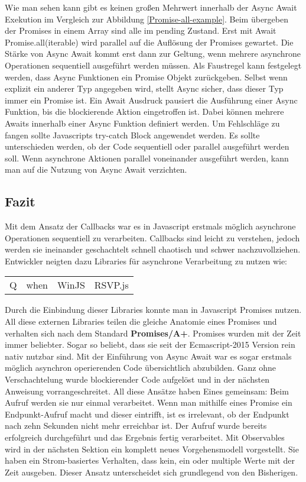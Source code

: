 \noindent
Wie man sehen kann gibt es keinen großen Mehrwert innerhalb der Async Await Exekution im Vergleich zur Abbildung \ref{Promise-all-example}. Beim übergeben der Promises in einem Array sind alle im pending Zustand. Erst mit Await Promise.all(iterable) wird parallel auf die Auflösung der Promises gewartet. Die Stärke von Async Await kommt erst dann zur Geltung, wenn mehrere asynchrone Operationen sequentiell ausgeführt werden müssen. Als Faustregel kann festgelegt werden, dass Async Funktionen ein Promise Objekt zurückgeben. Selbst wenn explizit ein anderer Typ angegeben wird, stellt Async sicher, dass dieser Typ immer ein Promise ist. Ein Await Ausdruck pausiert die Ausführung einer Async Funktion, bis die blockierende Aktion eingetroffen ist. Dabei können mehrere Awaits innerhalb einer Async Funktion definiert werden. Um Fehlschläge zu fangen sollte Javascripts try-catch Block angewendet werden. Es sollte unterschieden werden, ob der Code sequentiell oder parallel ausgeführt werden soll. Wenn asynchrone Aktionen parallel voneinander ausgeführt werden, kann man auf die Nutzung von Async Await verzichten.

\subsection{Fazit}

Mit dem Ansatz der Callbacks war es in Javascript erstmals möglich asynchrone Operationen sequentiell zu verarbeiten. Callbacks sind leicht zu verstehen, jedoch werden sie ineinander geschachtelt schnell chaotisch und schwer nachzuvollziehen. Entwickler neigten dazu Libraries für asynchrone Verarbeitung zu nutzen wie:

\begin{center}
\begin{tabular}{ l c c r }
  Q & when & WinJS & RSVP.js\\
\end{tabular}
\end{center}

\noindent
Durch die Einbindung dieser Libraries konnte man in Javascript Promises nutzen. All diese externen Libraries teilen die gleiche Anatomie eines Promises und verhalten sich nach dem Standard \textbf{Promises/A+}\cite{promises-a+}. Promises wurden mit der Zeit immer beliebter. Sogar so beliebt, dass sie seit der Ecmascript-2015 Version rein nativ nutzbar sind. Mit der Einführung von Async Await war es sogar erstmals möglich asynchron operierenden Code übersichtlich abzubilden. Ganz ohne Verschachtelung wurde blockierender Code aufgelöst und in der nächsten Anweisung vorrangeschreitet. All diese Ansätze haben Eines gemeinsam: Beim Aufruf werden sie nur einmal verarbeitet. Wenn man mithilfe eines Promise ein Endpunkt-Aufruf macht und dieser eintrifft, ist es irrelevant, ob der Endpunkt nach zehn Sekunden nicht mehr erreichbar ist. Der Aufruf wurde bereits erfolgreich durchgeführt und das Ergebnis fertig verarbeitet. Mit Observables wird in der nächsten Sektion ein komplett neues Vorgehensmodell vorgestellt. Sie haben ein Strom-basiertes Verhalten, dass kein, ein oder multiple Werte mit der Zeit ausgeben. Dieser Ansatz unterscheidet sich grundlegend von den Bisherigen.
